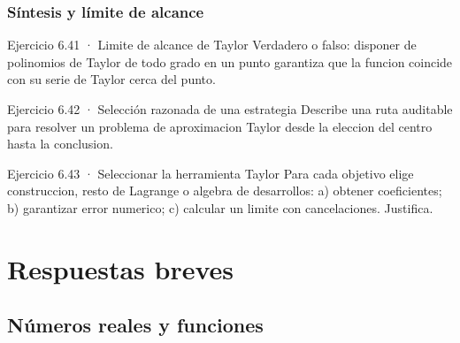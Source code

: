 \documentclass[10pt,a4paper,oneside,openany]{book}
\begin{document}
\section{Síntesis y límite de alcance}
\begin{PSevenExerciseFixed}{Ejercicio 6.41 · Limite de alcance de Taylor}
Verdadero o falso: disponer de polinomios de Taylor de todo grado en un punto garantiza que la funcion coincide con su serie de Taylor cerca del punto.
\end{PSevenExerciseFixed}
\begin{PSevenExerciseFixed}{Ejercicio 6.42 · Selección razonada de una estrategia}
Describe una ruta auditable para resolver un problema de aproximacion Taylor desde la eleccion del centro hasta la conclusion.
\end{PSevenExerciseFixed}
\begin{PSevenExerciseFixed}{Ejercicio 6.43 · Seleccionar la herramienta Taylor}
Para cada objetivo elige construccion, resto de Lagrange o algebra de desarrollos: a) obtener coeficientes; b) garantizar error numerico; c) calcular un limite con cancelaciones. Justifica.
\end{PSevenExerciseFixed}
\part{Respuestas breves}
\chapter{Números reales y funciones}
\end{document}
